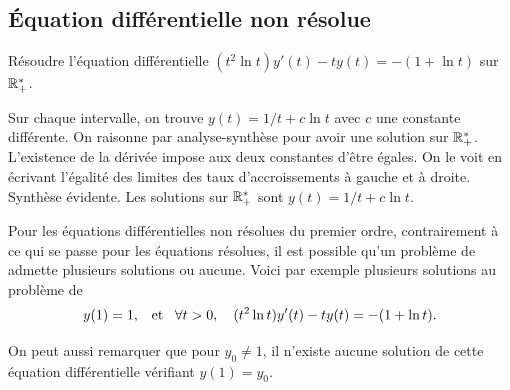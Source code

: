 \documentclass{magnolia}
\begin{document}
\subsection{Équation différentielle non résolue}

\begin{exoUnique}
\exo Résoudre l'équation différentielle
  $(t^2\ln t)y'(t)-ty(t)=-(1+\ln t)$ sur $\mathbb{R}_+^*$.
  \begin{sol}
  Sur chaque intervalle, on trouve $y(t)=1/t+c\ln t$ avec $c$ une constante différente. On raisonne par analyse-synthèse pour avoir une solution sur $\mathbb{R}_+^*$. L'existence de la dérivée impose aux deux constantes d'être égales. On le voit en écrivant l'égalité des limites des taux d'accroissements à gauche et à droite. Synthèse évidente. Les solutions sur $\mathbb{R}_+^*$
  sont $y(t)=1/t+c\ln t$.
  \end{sol}
\end{exoUnique}

\begin{remarqueUnique}
\remarque Pour les équations différentielles non résolues du premier ordre, 
  contrairement à ce qui se passe pour les équations résolues, il est possible
  qu'un problème de  admette plusieurs solutions ou aucune. Voici par exemple
  plusieurs solutions au problème de 
  \[y(1)=1, \quad\!\text{et}\quad\! \forall t>0,\quad (t^2\ln t)y'(t)-ty(t)=-(1+\ln t).\]
\begin{center}
\end{center}
  On peut aussi remarquer que pour $y_0\neq 1$, il n'existe aucune solution de cette équation différentielle
  vérifiant $y(1)=y_0$.
\end{remarqueUnique}
\end{document}
